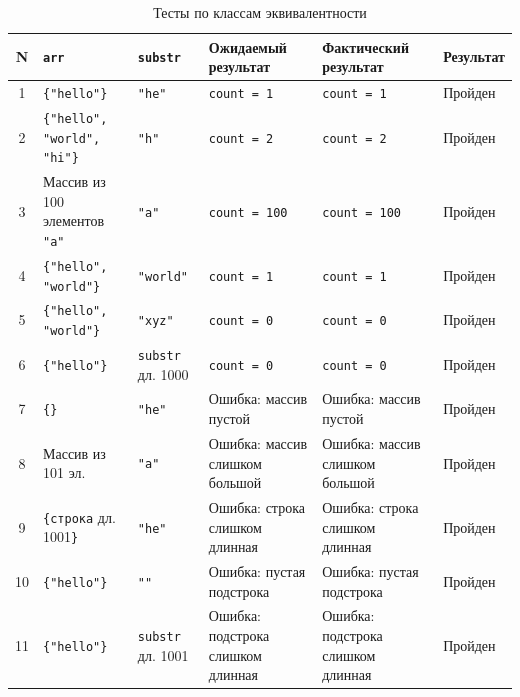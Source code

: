 \documentclass{article}[14pt]
\begin{document}
{\centering\large{
\begin{longtable}{|c|p{3.5cm}|p{2.5cm}|p{3cm}|p{3cm}|p{1.5cm}|}
    \caption{Тесты по классам эквивалентности}
    \label{tab:equiv-tests}\\
    \hline
    N & \texttt{arr} & \texttt{substr} & Ожидаемый результат & Фактический результат & Результат \\ \hline
    1 &
        \texttt{\{"hello"\}} &
        \texttt{"he"} &
        \texttt{count = 1} &
        \texttt{count = 1} &
        Пройден \\ \hline
    2 &
        \texttt{\{"hello",} \texttt{"world",} \texttt{"hi"\}} &
        \texttt{"h"} &
        \texttt{count = 2} &
        \texttt{count = 2} &
        Пройден \\ \hline
    3 &
        Массив из 100 элементов \texttt{"a"} &
        \texttt{"a"} &
        \texttt{count = 100} &
        \texttt{count = 100} &
        Пройден \\ \hline
    4 &
        \texttt{\{"hello",} \texttt{"world"\}} &
        \texttt{"world"} &
        \texttt{count = 1} &
        \texttt{count = 1} &
        Пройден \\ \hline
    5 &
        \texttt{\{"hello",} \texttt{"world"\}} &
        \texttt{"xyz"} &
        \texttt{count = 0} &
        \texttt{count = 0} &
        Пройден \\ \hline
    6 &
        \texttt{\{"hello"\}} &
        \texttt{substr} дл. 1000 &
        \texttt{count = 0} &
        \texttt{count = 0} &
        Пройден \\ \hline
    7 &
        \texttt{\{\}} &
        \texttt{"he"} &
        Ошибка: массив пустой &
        Ошибка: массив пустой &
        Пройден \\ \hline
    8 &
        Массив из 101 эл. &
        \texttt{"a"} &
        Ошибка: массив слишком большой &
        Ошибка: массив слишком большой &
        Пройден \\ \hline
    9 &
        \texttt{\{строка} дл. 1001\texttt{\}} &
        \texttt{"he"} &
        Ошибка: строка слишком длинная &
        Ошибка: строка слишком длинная &
        Пройден \\ \hline
    10 &
        \texttt{\{"hello"\}} &
        \texttt{""} &
        Ошибка: пустая подстрока &
        Ошибка: пустая подстрока &
        Пройден \\ \hline
    11 &
        \texttt{\{"hello"\}} &
        \texttt{substr} дл. 1001 &
        Ошибка: подстрока слишком длинная &
        Ошибка: подстрока слишком длинная &
        Пройден \\ \hline
\end{longtable}}}
\end{document}
